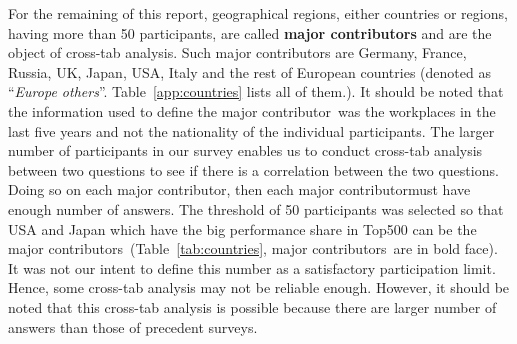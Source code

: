 \documentclass[preprint,5p,times]{elsarticle}
\newcommand{\revision}[2]{{\color{blue}#2}}
\def\mcountry{major contributor\xspace{}}%
\def\mcountries{major contributors\xspace{}}%
\begin{document}
For the remaining of this report, geographical regions, either countries or
regions, having more than 50 participants, are called {\bf major contributors}
and are the object of cross-tab analysis. Such major contributors are Germany,
France, Russia, UK, Japan, USA, Italy and the rest of European
countries \revision{}{(denoted as ``{\it Europe
    others}''. Table~\ref{app:countries} lists all of them.)}. It
should be noted that the information used to define the \mcountry\ was the
workplaces in the last \revision{5}{five} years and not the nationality of the individual
participants.
%
\revision{}{
The larger number of participants in our survey enables us to conduct
cross-tab analysis between two questions to see if there is a
correlation between the two questions. Doing so on each \mcountry,
then each \mcountry must have enough 
number of answers. The threshold of 50 
participants was selected so that USA and Japan which have the big
performance share in Top500 can be the
\mcountries\ (Table~\ref{tab:countries}, \mcountries\ are in bold
face). It was not our 
intent to define this number as a satisfactory participation
limit. Hence, some cross-tab analysis may not be reliable enough.
However, it should be noted that this cross-tab analysis is possible
because there are larger number of answers than those of precedent
surveys. 
}
%
\end{document}
